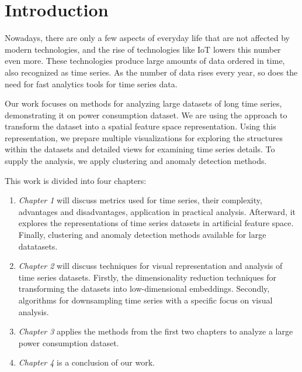 \chapter*{Introduction}
Nowadays, there are only a few aspects of everyday life that are not affected by modern technologies, and the rise of technologies like IoT lowers this number even more. These technologies produce large amounts of data ordered in time, also recognized as time series. As the number of data rises every year, so does the need for fast analytics tools for time series data.

Our work focuses on methods for analyzing large datasets of long time series, demonstrating it on power consumption dataset.  We are using the approach to transform the dataset into a spatial feature space representation. Using this representation, we prepare multiple visualizations for exploring the structures within the datasets and detailed views for examining time series details. To supply the analysis, we apply clustering and anomaly detection methods.

This work is divided into four chapters:
\begin{enumerate}
    \item \textit{Chapter 1} will discuss metrics used for time series, their complexity, advantages and disadvantages, application in practical analysis. Afterward, it explores the representations of time series datasets in artificial feature space. Finally, clustering and anomaly detection methods available for large datatasets.
    \item \textit{Chapter 2} will discuss techniques for visual representation and analysis of time series datasets. Firstly, the dimensionality reduction techniques for transforming the datasets into low-dimensional embeddings. Secondly, algorithms for downsampling time series with a specific focus on visual analysis.
    \item \textit{Chapter 3} applies the methods from the first two chapters to analyze a large power consumption dataset. 
    \item \textit{Chapter 4} is a conclusion of our work.
\end{enumerate}